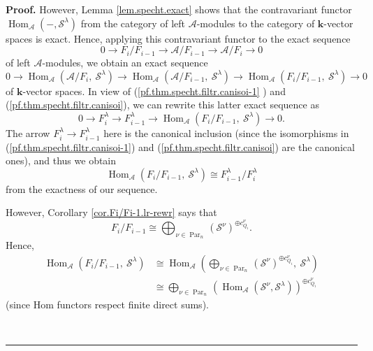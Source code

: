 \documentclass[numbers=enddot,12pt,final,onecolumn,notitlepage]{scrartcl}%
\theoremstyle{definition}
\newenvironment{proof}[1][Proof]{\noindent\textbf{#1.} }{\ \rule{0.5em}{0.5em}}
\begin{document}
\begin{proof}
However, Lemma \ref{lem.specht.exact} shows that the contravariant functor
$\operatorname*{Hom}\nolimits_{\mathcal{A}}\left(  -,\mathcal{S}^{\lambda
}\right)  $ from the category of left $\mathcal{A}$-modules to the category of
$\mathbf{k}$-vector spaces is exact. Hence, applying this contravariant
functor to the exact sequence%
\[
0\rightarrow F_{i}/F_{i-1}\rightarrow\mathcal{A}/F_{i-1}\rightarrow
\mathcal{A}/F_{i}\rightarrow0
\]
of left $\mathcal{A}$-modules, we obtain an exact sequence%
\[
0\rightarrow\operatorname*{Hom}\nolimits_{\mathcal{A}}\left(  \mathcal{A}%
/F_{i},\ \mathcal{S}^{\lambda}\right)  \rightarrow\operatorname*{Hom}%
\nolimits_{\mathcal{A}}\left(  \mathcal{A}/F_{i-1},\ \mathcal{S}^{\lambda
}\right)  \rightarrow\operatorname*{Hom}\nolimits_{\mathcal{A}}\left(
F_{i}/F_{i-1},\ \mathcal{S}^{\lambda}\right)  \rightarrow0
\]
of $\mathbf{k}$-vector spaces. In view of (\ref{pf.thm.specht.filtr.canisoi-1}%
) and (\ref{pf.thm.specht.filtr.canisoi}), we can rewrite this latter exact
sequence as%
\[
0\rightarrow F_{i}^{\lambda}\rightarrow F_{i-1}^{\lambda}\rightarrow
\operatorname*{Hom}\nolimits_{\mathcal{A}}\left(  F_{i}/F_{i-1},\ \mathcal{S}%
^{\lambda}\right)  \rightarrow0.
\]
The arrow $F_{i}^{\lambda}\rightarrow F_{i-1}^{\lambda}$ here is the canonical
inclusion (since the isomorphisms in (\ref{pf.thm.specht.filtr.canisoi-1}) and
(\ref{pf.thm.specht.filtr.canisoi}) are the canonical ones), and thus we
obtain%
\begin{equation}
\operatorname*{Hom}\nolimits_{\mathcal{A}}\left(  F_{i}/F_{i-1},\ \mathcal{S}%
^{\lambda}\right)  \cong F_{i-1}^{\lambda}/F_{i}^{\lambda}
\label{pf.thm.specht.filtr.iso5}%
\end{equation}
from the exactness of our sequence.

However, Corollary \ref{cor.Fi/Fi-1.lr-rewr} says that%
\begin{equation}
F_{i}/F_{i-1}\cong\bigoplus_{\nu\in\operatorname*{Par}\nolimits_{n}}\left(
\mathcal{S}^{\nu}\right)  ^{\oplus c_{Q_{i}}^{\nu}}.
\label{pf.thm.specht.filtr.iso6}%
\end{equation}
Hence,%
\begin{align}
\operatorname*{Hom}\nolimits_{\mathcal{A}}\left(  F_{i}/F_{i-1},\ \mathcal{S}%
^{\lambda}\right)   &  \cong\operatorname*{Hom}\nolimits_{\mathcal{A}}\left(
\bigoplus_{\nu\in\operatorname*{Par}\nolimits_{n}}\left(  \mathcal{S}^{\nu
}\right)  ^{\oplus c_{Q_{i}}^{\nu}},\ \mathcal{S}^{\lambda}\right) \nonumber\\
&  \cong\bigoplus_{\nu\in\operatorname*{Par}\nolimits_{n}}\left(
\operatorname*{Hom}\nolimits_{\mathcal{A}}\left(  \mathcal{S}^{\nu
},\mathcal{S}^{\lambda}\right)  \right)  ^{\oplus c_{Q_{i}}^{\nu}}
\label{pf.thm.specht.filtr.iso6Hom}%
\end{align}
(since Hom functors respect finite direct sums).


\end{proof}
\end{document}
